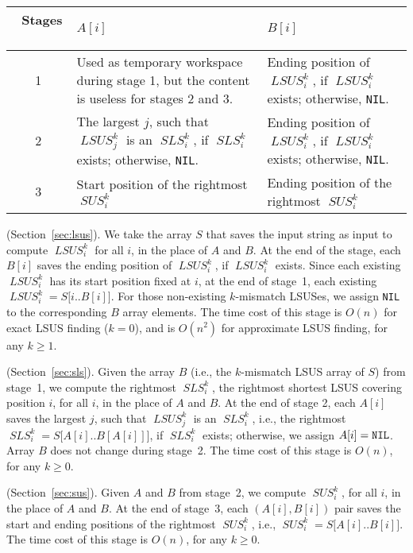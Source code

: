 \documentclass[11pt]{llncs}
\DeclareMathOperator{\sus}{\mathit{SUS}}
\DeclareMathOperator{\lsus}{\mathit{LSUS}}
\DeclareMathOperator{\sls}{\mathit{SLS}}
\begin{document}
\begin{center}
    \begin{tabular}{||c|m{7.5cm}|m{6.5cm}||}
      \hline
      \ Stages \ & \hspace*{30mm} $A[i]$ & \hspace*{30mm} $B[i]$\\
      \hline\hline
      1 & Used as temporary workspace during stage 1, but the content
      is useless for stages $2$ and $3$. & Ending position of $\lsus_i^k$, if $\lsus_i^k$ exists; otherwise, {\tt NIL}.\\
      \hline
      2  & The largest $j$, such that $\lsus_j^k$ is 
           an $\sls_i^k$, if $\sls_i^k$ exists;
      otherwise, {\tt NIL}.
      & Ending position of $\lsus_i^k$, if $\lsus_i^k$ exists; otherwise, {\tt NIL}. \\
      \hline
      3  & Start position of the rightmost $\sus_i^k$ & Ending
      position of the rightmost $\sus_i^k$\\
      \hline
   \end{tabular}
\end{center}




 (Section~\ref{sec:lsus}). We take the array
$S$ that saves the input string as input to compute $\lsus_i^k$ for
all $i$, in the place of $A$ and $B$. At the end of the stage, each
$B[i]$ saves the ending position of $\lsus_i^k$, if $\lsus_i^k$ exists. Since each existing
$\lsus_i^k$ has its start position fixed at $i$, at the end of
stage~1, each existing $\lsus_i^k = S\bigl[i .. B[i]\bigr]$.
For those non-existing $k$-mismatch LSUSes, we assign {\tt NIL} to the
corresponding $B$ array elements. The time cost of this stage is
$O(n)$ for exact LSUS finding ($k=0$), and is $O(n^2)$ for approximate
LSUS finding, for any $k\geq 1$.

\medskip 
{} (Section~\ref{sec:sls}). Given the array $B$
(i.e., the $k$-mismatch LSUS array of $S$) from stage~1, we compute
the rightmost $\sls_i^k$, the rightmost shortest LSUS covering
position $i$, for all $i$, in the place of $A$ and $B$. At the end of
stage 2, each $A[i]$ saves the largest $j$, such that $\lsus_j^k$ is
an $\sls_i^k$, i.e., the rightmost $\sls_i^k = S\bigl[A[i]..
B[A[i]] \bigr]$, if $\sls_i^k$ exists; otherwise, we assign $A[i] =
{\tt NIL}$. Array $B$ does not change during stage~2. The time cost of
this stage is $O(n)$, for any $k\geq 0$.

\medskip 
{} (Section~\ref{sec:sus}).  Given $A$
and $B$ from stage~2,
we compute $\sus_i^k$, for all $i$, in the place of $A$ and $B$. At
the end of stage~3, each $(A[i],B[i])$ pair saves the start and ending
positions of the rightmost $\sus_i^k$, i.e., $\sus_i^k =
S\bigl[A[i].. B[i]\bigr]$. The time cost of this stage is $O(n)$,
for any $k\geq 0$.
\end{document}
